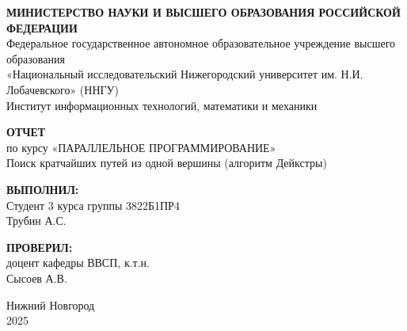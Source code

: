 \documentclass[12pt,a4paper]{extarticle}
\begin{document}
\begin{titlepage}
\begin{center}

\onehalfspacing

\begin{center}
    \textbf{МИНИСТЕРСТВО НАУКИ И ВЫСШЕГО ОБРАЗОВАНИЯ РОССИЙСКОЙ ФЕДЕРАЦИИ} \\
    Федеральное государственное автономное образовательное учреждение высшего образования \\
    «Национальный исследовательский Нижегородский университет им. Н.И. Лобачевского» (ННГУ) \\
    Институт информационных технологий, математики и механики
\end{center}

\vspace{4cm}

\begin{center}
    \textbf{ОТЧЕТ} \vspace{0.5cm}\\
    по курсу «ПАРАЛЛЕЛЬНОЕ ПРОГРАММИРОВАНИЕ» \vspace{0.5cm}\\
    Поиск кратчайших путей из одной вершины (алгоритм Дейкстры)
\end{center}

\vspace{4cm}

\begin{flushright}
    \textbf{ВЫПОЛНИЛ:} \\ 
    Студент 3 курса 
    группы 3822Б1ПР4 \\ 
    Трубин А.С. \\

    \vspace{1cm}

    \textbf{ПРОВЕРИЛ:} \\ 
    доцент кафедры ВВСП, к.т.н. \\ 
    Сысоев А.В.
\end{flushright}

\vspace{1cm}

\begin{center}
    Нижний Новгород\\
    2025\newpage
\end{center}

\end{center}
\end{titlepage}
\end{document}
